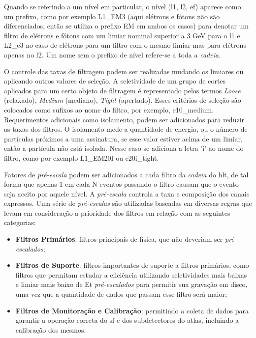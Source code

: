 Quando se referindo a um nível em particular, o nível (\gls{l1}, \gls{l2},
\gls{ef}) aparece como um prefixo, como por exemplo L1\_EM3 (aqui elétrons e
fótons não são diferenciados, então se utiliza o prefixo EM em ambos os casos)
para denotar um filtro de elétrons e fótons com um limiar nominal superior a 3
GeV para o \gls{l1} e L2\_e3 no caso de elétrons para um filtro com o mesmo
limiar mas para elétrons apenas no \gls{l2}. Um nome sem o prefixo de nível
refere-se a toda a \emph{cadeia}.

O controle das taxas de filtragem podem ser realizadas mudando os limiares ou
aplicando outros valores de seleção. A seletividade de um grupo de cortes
aplicados para um certo objeto de filtragem é representado pelos termos
\emph{Loose} (relaxado), \emph{Medium} (mediano), \emph{Tight} (apertado). Esses
critérios de seleção são colocados como sufixos ao nome do filtro, por exemplo,
e10\_medium. Requerimentos adicionais como isolamento, podem ser adicionados
para reduzir as taxas dos filtros. O isolamento mede a quantidade de energia, ou
o número de partículas próximos a uma assinatura, se esse valor estiver acima de
um limiar, então a partícula não está isolada. Nesse caso se adiciona a letra
'i' ao nome do filtro, como por exemplo L1\_EM20I ou e20i\_tight.

Fatores de \emph{pré-escala} podem ser adicionados a cada filtro da 
\emph{cadeia} do \gls{hlt}, de tal forma que apenas 1 em cada N eventos passando
o filtro causam que o evento seja aceito por aquele nível. A \emph{pré-escala}
controla a taxa e composição dos canais expressos. Uma série de
\emph{pré-escalas} são utilizadas baseadas em diversas regras que levam em
consideração a prioridade dos filtros em relação com as seguintes categorias:

\begin{itemize}
\item \textbf{Filtros Primários}: filtros principais de física, que não deveriam
ser \emph{pré-escalados};
\item \textbf{Filtros de Suporte}: filtros importantes de suporte a filtros
primários, como filtros que permitam estudar a eficiência utilizando 
seletividades mais baixas e limiar mais baixo de \gls{Et} \emph{pré-escalados}
para permitir sua gravação em disco, uma vez que a quantidade de dados que
passam esse filtro será maior;
\item \textbf{Filtros de Monitoração e Calibração}: permitindo a coleta de dados
para garantir a operação correta do \gls{sf} e dos subdetectores do \gls{atlas},
incluindo a calibração dos mesmos. 
\end{itemize}

